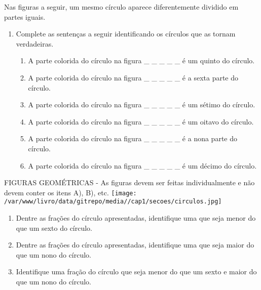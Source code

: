 \documentclass[a4,12pt]{book}
\begin{document}
Nas figuras a seguir, um mesmo círculo aparece diferentemente dividido em partes iguais. 
\begin{enumerate} [\quad a)] %
  \item     Complete as sentenças a seguir identificando os círculos que as tornam verdadeiras.     
\begin{enumerate} [\quad I)] %
      \item        	A parte colorida do círculo na figura \_ \_ \_ \_ \_ é um quinto do círculo.
      \item        	A parte colorida do círculo na figura \_ \_ \_ \_ \_ é a sexta parte do círculo.
      \item        	A parte colorida do círculo na figura \_ \_ \_ \_ \_ é um sétimo do círculo.
      \item        	A parte colorida do círculo na figura \_ \_ \_ \_ \_ é um oitavo do círculo.
      \item        	A parte colorida do círculo na figura \_ \_ \_ \_ \_ é a nona parte do círculo.
      \item        	A parte colorida do círculo na figura \_ \_ \_ \_ \_ é um décimo do círculo.        \mbox{} \newline          
\end{enumerate} %

\end{enumerate} %
\begin{imagem*}[breakable]{}{}   FIGURAS GEOMÉTRICAS - As figuras devem ser feitas individualmente e não devem conter os itens A), B), etc.  
    \texttt{[image: /var/www/livro/data/gitrepo/media//cap1/secoes/circulos.jpg]}  
\end{imagem*}\mbox{} \newline 
\begin{enumerate} [\quad a)] %
  \item     Dentre as frações do círculo apresentadas, identifique uma que seja menor do que um sexto do círculo.
  \item     Dentre as frações do círculo apresentadas, identifique uma que seja maior do que um nono do círculo.
  \item     Identifique uma fração do círculo que seja menor do que um sexto e maior do que um nono do círculo.
\end{enumerate} %
\end{document}
